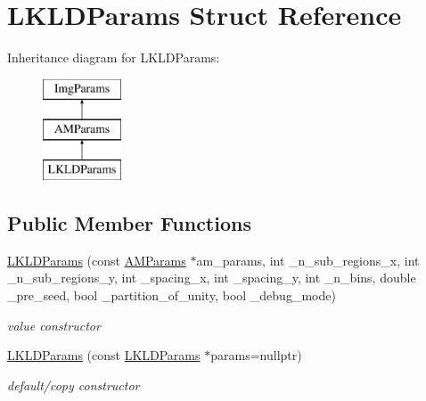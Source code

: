 \hypertarget{structLKLDParams}{\section{L\-K\-L\-D\-Params Struct Reference}
\label{structLKLDParams}
}
Inheritance diagram for L\-K\-L\-D\-Params\-:\begin{figure}[H]
\begin{center}
\leavevmode
\includegraphics[height=3.000000cm]{structLKLDParams}
\end{center}
\end{figure}
\subsection*{Public Member Functions}
\begin{DoxyCompactItemize}
\item 
\hypertarget{structLKLDParams_a838e21d8aa0e31a5b14e036406b444f0}{\hyperlink{structLKLDParams_a838e21d8aa0e31a5b14e036406b444f0}{L\-K\-L\-D\-Params} (const \hyperlink{structAMParams}{A\-M\-Params} $\ast$am\-\_\-params, int \-\_\-n\-\_\-sub\-\_\-regions\-\_\-x, int \-\_\-n\-\_\-sub\-\_\-regions\-\_\-y, int \-\_\-spacing\-\_\-x, int \-\_\-spacing\-\_\-y, int \-\_\-n\-\_\-bins, double \-\_\-pre\-\_\-seed, bool \-\_\-partition\-\_\-of\-\_\-unity, bool \-\_\-debug\-\_\-mode)}\label{structLKLDParams_a838e21d8aa0e31a5b14e036406b444f0}

\begin{DoxyCompactList}\small\item\em value constructor \end{DoxyCompactList}\item 
\hypertarget{structLKLDParams_afec38fd147a84cde5192218cc39932fa}{\hyperlink{structLKLDParams_afec38fd147a84cde5192218cc39932fa}{L\-K\-L\-D\-Params} (const \hyperlink{structLKLDParams}{L\-K\-L\-D\-Params} $\ast$params=nullptr)}\label{structLKLDParams_afec38fd147a84cde5192218cc39932fa}

\begin{DoxyCompactList}\small\item\em default/copy constructor \end{DoxyCompactList}\end{DoxyCompactItemize}
